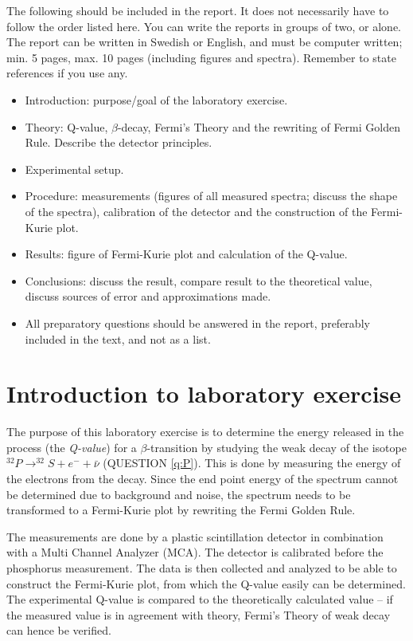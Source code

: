 \documentclass[a4,11pt, notitlepage]{article}
\begin{document}
The following should be included in the report. It does not necessarily have to follow the order listed here. You can write the reports in groups of two, or alone. The report can be written in Swedish or English, and must be computer written; min. 5 pages, max. 10 pages (including figures and spectra). Remember to state references if you use any. 
\begin{itemize}
\item Introduction: purpose/goal of the laboratory exercise.
\item Theory: Q-value, $\beta$-decay, Fermi's Theory and the rewriting of Fermi Golden Rule. Describe the detector principles.
\item Experimental setup. 
\item Procedure: measurements (figures of all measured spectra; discuss the shape of the spectra), calibration of the detector and the construction of the Fermi-Kurie plot. 
\item Results: figure of Fermi-Kurie plot and calculation of the Q-value.
\item Conclusions: discuss the result, compare result to the theoretical value, discuss sources of error and approximations made.
\item All preparatory questions should be answered in the report, preferably included in the text, and not as a list.

\end{itemize}


\pagebreak
\section{Introduction to laboratory exercise}

The purpose of this laboratory exercise is to determine the energy released in the process (the \textit{Q-value}) for a $\beta$-transition by studying the weak decay of the isotope $^{32}P\rightarrow ^{32}S + e^- + \bar{\nu}$ (QUESTION \ref{q:P}). This is done by measuring the energy of the electrons from the decay. Since the end point energy of the spectrum cannot be determined due to background and noise, the spectrum needs to be transformed to a Fermi-Kurie plot by rewriting the Fermi Golden Rule. 

The measurements are done by a plastic scintillation detector in combination with a Multi Channel Analyzer (MCA). The detector is calibrated before the phosphorus measurement. The data is then collected and analyzed to be able to construct the Fermi-Kurie plot, from which the Q-value easily can be determined. The experimental Q-value is compared to the theoretically calculated value -- if the measured value is in agreement with theory, Fermi's Theory of weak decay can hence be verified.  
\end{document}
